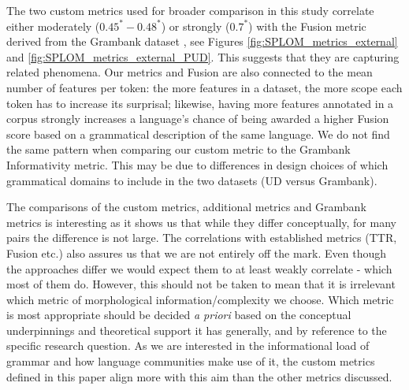 \documentclass[USenglish]{article}
\begin{document}
The two custom metrics used for broader comparison in this study correlate either moderately ($0.45^*-0.48^*$) or strongly ($0.7^*$) with the Fusion metric derived from the Grambank dataset \citep{grambank_release, shcherbakova2023societies}, see Figures \ref{fig:SPLOM_metrics_external} and \ref{fig:SPLOM_metrics_external_PUD}. 
This suggests that they are capturing related phenomena. 
Our metrics and Fusion are also connected to the mean number of features per token: the more features in a dataset, the more scope each token has to increase its surprisal; likewise, having more features annotated in a corpus strongly increases a language's chance of being awarded a higher Fusion score based on a grammatical description of the same language.
We do not find the same pattern when comparing our custom metric to the Grambank Informativity metric. 
This may be due to differences in design choices of which grammatical domains to include in the two datasets (UD versus Grambank).

The comparisons of the custom metrics, additional metrics and Grambank metrics is interesting as it shows us that while they differ conceptually, for many pairs the difference is not large. 
The correlations with established metrics (TTR, Fusion etc.) also assures us that we are not entirely off the mark. 
Even though the approaches differ we would expect them to at least weakly correlate - which most of them do. 
However, this should not be taken to mean that it is irrelevant which metric of morphological information/complexity we choose. %
Which metric is most appropriate should be decided \textit{a priori} based on the conceptual underpinnings and theoretical support it has generally, and by reference to the specific research question.
As we are interested in the informational load of grammar and how language communities make use of it, the custom metrics defined in this paper align more with this aim than the other metrics discussed. 
\end{document}
